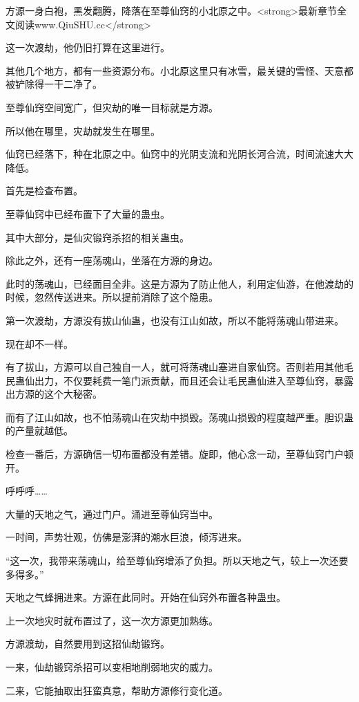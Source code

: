 
\begin{this_body}

方源一身白袍，黑发翻腾，降落在至尊仙窍的小北原之中。<strong>最新章节全文阅读www.QiuSHU.cc</strong>

这一次渡劫，他仍旧打算在这里进行。

其他几个地方，都有一些资源分布。小北原这里只有冰雪，最关键的雪怪、天意都被铲除得一干二净了。

至尊仙窍空间宽广，但灾劫的唯一目标就是方源。

所以他在哪里，灾劫就发生在哪里。

仙窍已经落下，种在北原之中。仙窍中的光阴支流和光阴长河合流，时间流速大大降低。

首先是检查布置。

至尊仙窍中已经布置下了大量的蛊虫。

其中大部分，是仙灾锻窍杀招的相关蛊虫。

除此之外，还有一座荡魂山，坐落在方源的身边。

此时的荡魂山，已经面目全非。这是方源为了防止他人，利用定仙游，在他渡劫的时候，忽然传送进来。所以提前消除了这个隐患。

第一次渡劫，方源没有拔山仙蛊，也没有江山如故，所以不能将荡魂山带进来。

现在却不一样。

有了拔山，方源可以自己独自一人，就可将荡魂山塞进自家仙窍。否则若用其他毛民蛊仙出力，不仅要耗费一笔门派贡献，而且还会让毛民蛊仙进入至尊仙窍，暴露出方源的这个大秘密。

而有了江山如故，也不怕荡魂山在灾劫中损毁。荡魂山损毁的程度越严重。胆识蛊的产量就越低。

检查一番后，方源确信一切布置都没有差错。旋即，他心念一动，至尊仙窍门户顿开。

呼呼呼……

大量的天地之气，通过门户。涌进至尊仙窍当中。

一时间，声势壮观，仿佛是澎湃的潮水巨浪，倾泻进来。

“这一次，我带来荡魂山，给至尊仙窍增添了负担。所以天地之气，较上一次还要多得多。”

天地之气蜂拥进来。方源在此同时。开始在仙窍外布置各种蛊虫。

上一次地灾时就布置过了，这一次方源更加熟练。

方源渡劫，自然要用到这招仙劫锻窍。

一来，仙劫锻窍杀招可以变相地削弱地灾的威力。

二来，它能抽取出狂蛮真意，帮助方源修行变化道。


\end{this_body}
